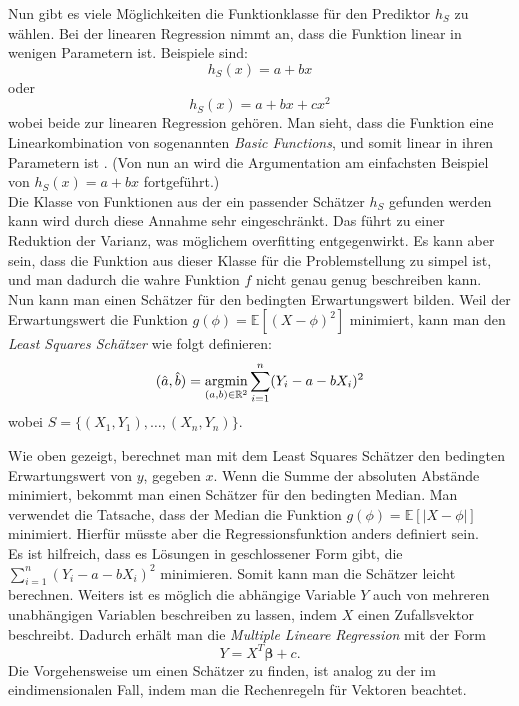 Nun gibt es viele M\"oglichkeiten die Funktionklasse f\"ur den Prediktor $h_S$ zu w\"ahlen. Bei der linearen
Regression nimmt an, dass die Funktion linear in wenigen Parametern ist. Beispiele sind:
$$ h_S(x) = a + bx $$ 
oder 
$$ h_S(x) = a + bx + cx^2$$
wobei beide zur linearen Regression geh\"oren. Man sieht, dass die Funktion eine Linearkombination von sogenannten \textit{Basic Functions}, und somit 
linear in ihren Parametern ist \cite{bishop}. (Von nun an wird die Argumentation am einfachsten Beispiel von $ h_S(x) = a + bx $ fortgef\"uhrt.)\\ 

Die Klasse von Funktionen aus der ein passender Sch\"atzer $h_S$ gefunden werden kann wird durch diese Annahme sehr eingeschr\"ankt. Das f\"uhrt zu einer
Reduktion der Varianz, was m\"oglichem overfitting entgegenwirkt. Es kann aber sein, dass die Funktion aus dieser Klasse f\"ur die Problemstellung zu simpel ist, und 
man dadurch die wahre Funktion $f$ nicht genau genug beschreiben kann. \\

Nun kann man einen Sch\"atzer f\"ur den bedingten Erwartungswert bilden.
Weil der Erwartungswert die Funktion $g(\phi) = \mathbb{E}[(X - \phi)^2]$ minimiert, kann man den \textit{Least Squares Sch\"atzer} wie folgt definieren:
$$ (\hat{a}, \hat{b}) = \operatorname*{argmin}_{(a,b) \in \mathbb{R}^2} \sum_{i=1}^n (Y_i - a - bX_i)^2$$
wobei $S = \{(X_1, Y_1), \dots , (X_n,Y_n)\}$.

Wie oben gezeigt, berechnet man mit dem Least Squares Sch\"atzer den bedingten Erwartungswert von $y$, gegeben $x$. 
Wenn die Summe der absoluten Abst\"ande minimiert, bekommt man einen Sch\"atzer f\"ur den bedingten Median. Man verwendet die Tatsache, dass
der Median die Funktion $g(\phi) = \mathbb{E}[|X - \phi|]$ minimiert. Hierfür müsste aber die Regressionsfunktion anders definiert sein. \\ 

Es ist hilfreich, dass es L\"osungen in geschlossener Form gibt, die $\sum_{i=1}^n (Y_i - a - bX_i)^2 $ minimieren. Somit kann man die Sch\"atzer leicht berechnen.
Weiters ist es m\"oglich die abh\"angige Variable $Y$ auch von mehreren unabh\"angigen Variablen beschreiben zu lassen, indem $X$ einen Zufallsvektor beschreibt.
Dadurch erh\"alt man die \textit{Multiple Lineare Regression} 
mit der Form 
$$ Y = X^T\mathbf{\beta} + c. $$
Die Vorgehensweise um einen Sch\"atzer zu finden, ist analog zu der im eindimensionalen Fall, indem man die Rechenregeln f\"ur Vektoren beachtet. \\ 

